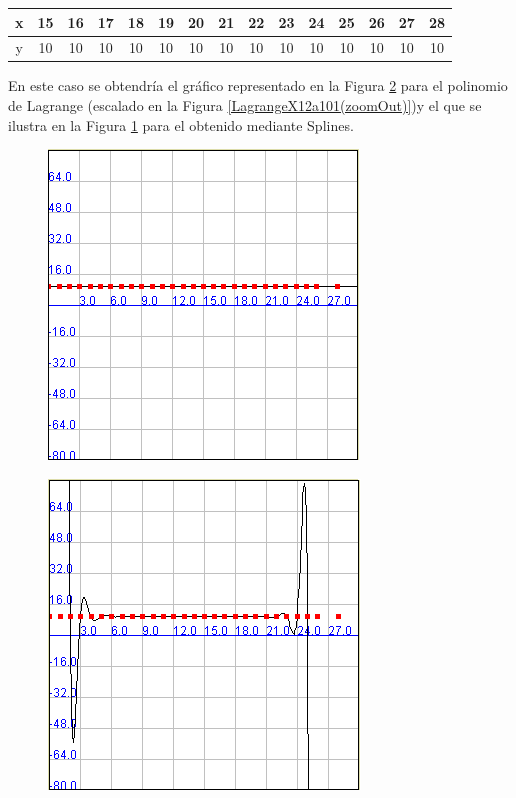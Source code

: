 \documentclass[a4paper]{article}
\begin{document}
 \smallskip

\begin{tabular}{  | c || c | c | c | c | c | c | c | c | c | c | c | c | c | c | }
 \hline                 
   x&15& 16 & 17 & 18 & 19 & 20 & 21 & 22 & 23 & 24 & 25 & 26 & 27 & 28\\
 \hline    
y & 10 & 10 & 10& 10& 10& 10& 10& 10& 10& 10& 10& 10& 10& 10 \\
 \hline  
 \end{tabular}

\bigskip

 En este caso se obtendría el gráfico representado en la Figura \ref{LagrangeX12a101} para el polinomio de Lagrange (escalado en la Figura \ref{LagrangeX12a101(zoomOut)})y el que se ilustra en la Figura \ref{SplinesX12a101} para el obtenido mediante Splines.\\

\begin{figure}[h!]
	\caption{}
	\begin{center}
	\includegraphics[scale=1]{imagenes/SplinesX12a101}
	\label{SplinesX12a101}
  \end{center}
\end{figure}

\begin{figure}
	\caption{}
	\begin{center}
	\includegraphics[scale=1]{imagenes/LagrangeX12a101}
	\label{LagrangeX12a101}
  \end{center}
\end{figure}
\end{document}
